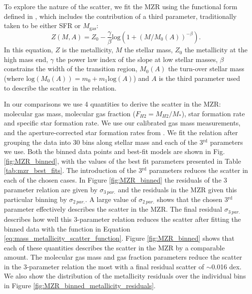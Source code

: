 \documentclass[fleqn,usenatbib]{mnras}
\begin{document}
To explore the nature of the scatter, we fit the MZR using the functional form defined in \cite{curti2020}, which includes the contribution of a third parameter, traditionally taken to be either SFR or $M_{\textrm{gas}}$:
\begin{equation}
\label{eq:mass_metallicity_scatter_function}
    Z(M, A) = Z_0 - \frac{\gamma}{\beta} \mathrm{log}(1 + (M/M_0(A))^{-\beta} ) .
\end{equation}
In this equation, $Z$ is the metallicity, $M$ the stellar mass, $Z_0$ the metallicity at the high mass end, $\gamma$ the power law index of the slope at low stellar masses, $\beta$ constrains the width of the transition region, $M_0(A)$ the turn-over stellar mass (where $\textrm{log}(M_0(A)) = m_0 + m_1\textrm{log}(A)$) and $A$ is the third parameter used to describe the scatter in the relation.

In our comparisons we use 4 quantities to derive the scatter in the MZR: molecular gas mass, molecular gas fraction ($F_{H2} = M_{H2}/M_{*}$), star formation rate and specific star formation rate. We use our calibrated gas mass measurements, and the aperture-corrected star formation rates from \cite{brinchmann2004}. We fit the relation after grouping the data into 30 bins along stellar mass and each of the 3$^{\textrm{rd}}$ parameters we use. Both the binned data points and best-fit models are shown in Fig. \ref{fig:MZR_binned}, with the values of the best fit parameters presented in Table \ref{tab:mzr_best_fits}. The introduction of the 3$^{\textrm{rd}}$ parameters reduces the scatter in each of the chosen cases. In Figure \ref{fig:MZR_binned} the residuals of the 3 parameter relation are given by $\sigma_{3\: par.}$ and the residuals in the MZR given this particular binning by $\sigma_{2\: par.}$. 
A large value of $\sigma_{2\: par.}$ shows that the chosen 3$^{\textrm{rd}}$ parameter effectively describes the scatter in the MZR. The final residual $\sigma_{3\: par.}$ describes how well this 3-parameter relation reduces the scatter after fitting the binned data with the function in Equation \ref{eq:mass_metallicity_scatter_function}. Figure \ref{fig:MZR_binned} shows that each of these quantities describes the scatter in the MZR by a comparable amount. The molecular gas mass and gas fraction parameters reduce the scatter in the 3-parameter relation the most with a final residual scatter of $\sim$0.016 dex. We also show the distribution of the metallicity residuals over the individual bins in Figure \ref{fig:MZR_binned_metallicity_residuals}. 
\end{document}
